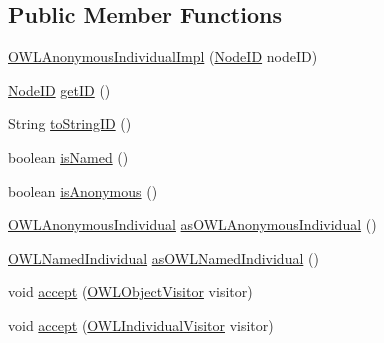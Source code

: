 \subsection*{Public Member Functions}
\begin{DoxyCompactItemize}
\item 
\hyperlink{classuk_1_1ac_1_1manchester_1_1cs_1_1owl_1_1owlapi_1_1_o_w_l_anonymous_individual_impl_a9525244bf53e4a9bd9831dd0aea75fa5}{O\-W\-L\-Anonymous\-Individual\-Impl} (\hyperlink{classorg_1_1semanticweb_1_1owlapi_1_1model_1_1_node_i_d}{Node\-I\-D} node\-I\-D)
\item 
\hyperlink{classorg_1_1semanticweb_1_1owlapi_1_1model_1_1_node_i_d}{Node\-I\-D} \hyperlink{classuk_1_1ac_1_1manchester_1_1cs_1_1owl_1_1owlapi_1_1_o_w_l_anonymous_individual_impl_a2455e2162f986658fe98054ab9cb652b}{get\-I\-D} ()
\item 
String \hyperlink{classuk_1_1ac_1_1manchester_1_1cs_1_1owl_1_1owlapi_1_1_o_w_l_anonymous_individual_impl_ac337ee9026a74241c030766c00381085}{to\-String\-I\-D} ()
\item 
boolean \hyperlink{classuk_1_1ac_1_1manchester_1_1cs_1_1owl_1_1owlapi_1_1_o_w_l_anonymous_individual_impl_a34b69b028b059358c274fc09be404237}{is\-Named} ()
\item 
boolean \hyperlink{classuk_1_1ac_1_1manchester_1_1cs_1_1owl_1_1owlapi_1_1_o_w_l_anonymous_individual_impl_a74765eedd5194792217753fdaec92bae}{is\-Anonymous} ()
\item 
\hyperlink{interfaceorg_1_1semanticweb_1_1owlapi_1_1model_1_1_o_w_l_anonymous_individual}{O\-W\-L\-Anonymous\-Individual} \hyperlink{classuk_1_1ac_1_1manchester_1_1cs_1_1owl_1_1owlapi_1_1_o_w_l_anonymous_individual_impl_a77c1569016a7b287e589809707e82f72}{as\-O\-W\-L\-Anonymous\-Individual} ()
\item 
\hyperlink{interfaceorg_1_1semanticweb_1_1owlapi_1_1model_1_1_o_w_l_named_individual}{O\-W\-L\-Named\-Individual} \hyperlink{classuk_1_1ac_1_1manchester_1_1cs_1_1owl_1_1owlapi_1_1_o_w_l_anonymous_individual_impl_aea61ce74089ef49839eff5b4a6124790}{as\-O\-W\-L\-Named\-Individual} ()
\item 
void \hyperlink{classuk_1_1ac_1_1manchester_1_1cs_1_1owl_1_1owlapi_1_1_o_w_l_anonymous_individual_impl_a0cd1775414036b75d0a6dedddaff608d}{accept} (\hyperlink{interfaceorg_1_1semanticweb_1_1owlapi_1_1model_1_1_o_w_l_object_visitor}{O\-W\-L\-Object\-Visitor} visitor)
\item 
void \hyperlink{classuk_1_1ac_1_1manchester_1_1cs_1_1owl_1_1owlapi_1_1_o_w_l_anonymous_individual_impl_a44908cb3c8e83723545ba8c70d35b569}{accept} (\hyperlink{interfaceorg_1_1semanticweb_1_1owlapi_1_1model_1_1_o_w_l_individual_visitor}{O\-W\-L\-Individual\-Visitor} visitor)

\end{DoxyCompactItemize}
